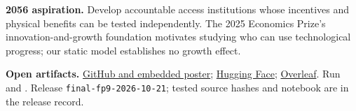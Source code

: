 \noindent\textbf{2056 aspiration.} Develop accountable access institutions whose incentives and physical benefits can be tested independently. The 2025 Economics Prize's innovation-and-growth foundation \cite{nobel2025} motivates studying who can use technological progress; our static model establishes no growth effect.

\noindent\textbf{Open artifacts.} \href{https://github.com/dku-comsci-econ206-Autumn2026/-PS2-FP9-ComputeCommons}{GitHub and embedded poster}; \href{https://huggingface.co/spaces/dku-comsci-econ206-2026/compute-commons}{Hugging Face}; \href{https://www.overleaf.com/project/6ac3a483f8fd778ea3fdc65f}{Overleaf}. Run  and . Release \texttt{final-fp9-2026-10-21}; tested source hashes and notebook are in the release record.
